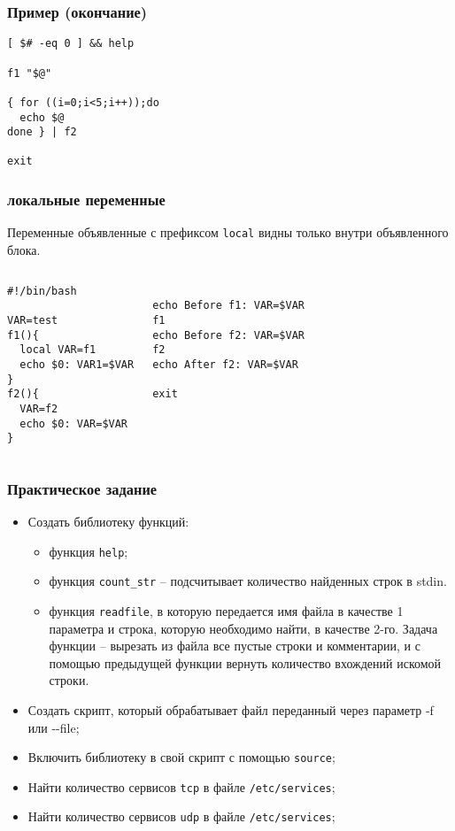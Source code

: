 \begin{frame}[fragile]
	\frametitle{Пример (окончание)}
	\small
	\begin{lstlisting}
[ $# -eq 0 ] && help

f1 "$@"

{ for ((i=0;i<5;i++));do
  echo $@
done } | f2

exit
	\end{lstlisting}

\end{frame}

\begin{frame}[fragile]
	\frametitle{локальные переменные}

	Переменные объявленные с префиксом {\tt local} видны только внутри объявленного блока.

	\small
	\begin{columns}
		\begin{lstlisting}
#!/bin/bash

VAR=test
f1(){
  local VAR=f1
  echo $0: VAR1=$VAR
}
f2(){
  VAR=f2
  echo $0: VAR=$VAR
}
		\end{lstlisting}
		\begin{lstlisting}

echo Before f1: VAR=$VAR
f1
echo Before f2: VAR=$VAR
f2
echo After f2: VAR=$VAR

exit
		\end{lstlisting}
	\end{columns}

\end{frame}

\begin{frame}
	\frametitle{Практическое задание}
	\begin{itemize}
		\item Создать библиотеку функций:
			\begin{itemize}
				\item функция {\tt help};
				\item функция {\tt count\_str} -- подсчитывает количество найденных строк в stdin.
				\item функция {\tt readfile}, в которую передается имя файла в качестве 1 параметра
					и строка, которую необходимо найти, в качестве 2-го.
					Задача функции -- вырезать из файла все пустые строки и комментарии, 
					и с помощью предыдущей функции вернуть количество вхождений искомой строки.
			\end{itemize}
		\item Создать скрипт, который обрабатывает файл переданный через параметр -f или -{}-file;
		\item Включить библиотеку в свой скрипт с помощью {\tt source};
		\item Найти количество сервисов {\tt tcp} в файле {\tt /etc/services};
		\item Найти количество сервисов {\tt udp} в файле {\tt /etc/services};
  \end{itemize}
\end{frame}

